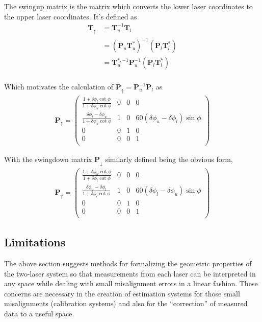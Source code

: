 The swingup matrix is the matrix which converts the lower laser
coordinates to the upper laser coordinates. It's defined as
\begin{align}
  \mathbf{T}_{\uparrow} &= \mathbf{T}_{u}^{-1}\mathbf{T}_{l} \\
  &= (\mathbf{P}_{u}\mathbf{T}_{u}^{*})^{-1}
  (\mathbf{P}_{l}\mathbf{T}_{l}^{*}) \\
  &= \mathbf{T}_{u}^{*, -1}\mathbf{P}_{u}^{-1}
  (\mathbf{P}_{l}\mathbf{T}_{l}^{*}) \\
\end{align}

Which motivates the calculation of $\mathbf{P}_{\uparrow} =
\mathbf{P}_{u}^{-1}\mathbf{P}_{l}$ as
\begin{align}
  \mathbf{P}_{\uparrow} = 
  \left(
  \begin{array}{cccc}
    \frac{1 + \delta\phi_{l} \cot\phi}{1 + \delta\phi_{u} \cot\phi} &
    0 & 0 & 0 \\
    \frac{\delta\phi_{l} - \delta\phi_{u}}{1 + \delta\phi_{u}
      \cot\phi} & 1 & 0 & 60
    \left(\delta\phi_{u}-\delta\phi_{l}\right)\sin\phi \\
    0 & 0 & 1 & 0 \\
    0 & 0 & 0 & 1 \\
  \end{array}
  \right)
\end{align}

With the swingdown matrix $\mathbf{P}_{\downarrow}$ similarly defined
being the obvious form,
\begin{align}
  \mathbf{P}_{\uparrow} = 
  \left(
  \begin{array}{cccc}
    \frac{1 + \delta\phi_{u} \cot\phi}{1 + \delta\phi_{l} \cot\phi} &
    0 & 0 & 0 \\
    \frac{\delta\phi_{u} - \delta\phi_{l}}{1 + \delta\phi_{l}
      \cot\phi} & 1 & 0 & 60
    \left(\delta\phi_{l}-\delta\phi_{u}\right)\sin\phi \\
    0 & 0 & 1 & 0 \\
    0 & 0 & 0 & 1 \\
  \end{array}
  \right)
\end{align}

\subsection{Limitations}
\label{sec:limitations}

The above section suggests methods for formalizing the geometric
properties of the two-laser system so that measurements from each
laser can be interpreted in any space while dealing with small
misalignment errors in a linear fashion. These concerns are necessary
in the creation of estimation systems for those small misalignments
(calibration systems) and also for the ``correction'' of measured data
to a useful space. 

